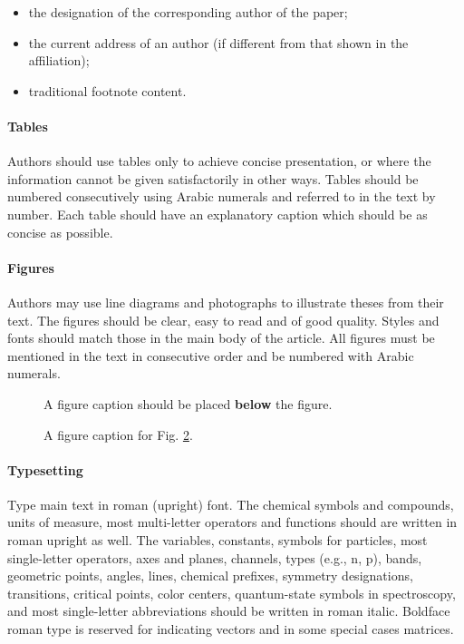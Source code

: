 \documentclass[USenglish,oneside,twocolumn]{article}
\begin{document}
\begin{itemize}
\item the designation of the corresponding author of the paper;
\item the current address of an author (if different from that shown in the affiliation);
\item traditional footnote content.
\end{itemize}

\paragraph{Tables}
    Authors should use tables only to achieve concise presentation, or where the information cannot be given satisfactorily in other ways. Tables should be numbered consecutively using Arabic numerals and referred to in the text by number. Each table should have an explanatory caption which should be as concise as possible.



\paragraph{Figures}
    Authors may use line diagrams and photographs to illustrate theses from their text. The figures should be clear, easy to read and of good quality. Styles and fonts should match those in the main body of the article. All figures must be mentioned in the text in consecutive order and be numbered with Arabic numerals. 

\begin{figure}
\caption{A figure caption should be placed {\bf below} the figure.\label{fig1}}
\end{figure}

\begin{figure}
\caption{A figure caption for Fig. \ref{fig2}.\label{fig2}}
\end{figure}

\paragraph{Typesetting}
    Type main text in roman (upright) font. The chemical symbols and compounds, units of measure, most multi-letter operators and functions should are written in roman upright as well. The variables, constants, symbols for particles, most single-letter operators, axes and planes, channels, types (e.g., n, p), bands, geometric points, angles, lines, chemical prefixes, symmetry designations, transitions, critical points, color centers, quantum-state symbols in spectroscopy, and most single-letter abbreviations should be written in roman italic. Boldface roman type is reserved for indicating vectors and in some special cases matrices. 
\end{document}
